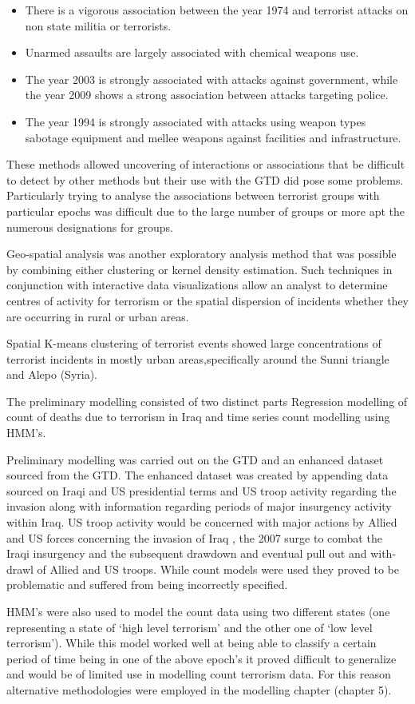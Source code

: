 \begin{itemize}
\item There is a vigorous association between the year 1974 and terrorist attacks on non state militia or terrorists.
\item Unarmed assaults are largely associated with chemical weapons use.
\item The year 2003 is strongly associated with attacks against government, while the year 2009 shows a strong association between attacks targeting police.  
\item The year 1994 is strongly associated with attacks using weapon types sabotage equipment and mellee weapons against facilities and infrastructure.
\end{itemize}

These methods allowed uncovering of interactions or associations that be difficult to detect by other methods but their use with the GTD did pose some problems. Particularly trying to analyse the associations between terrorist groups with particular epochs was difficult due to the large number of groups or more apt the numerous designations for groups. 

Geo-spatial analysis was another exploratory analysis method that was possible by combining either clustering or kernel density estimation.  Such techniques in conjunction with interactive data visualizations allow an analyst to determine centres of activity for terrorism or the spatial dispersion of incidents whether they are occurring in rural or urban areas. 

Spatial K-means clustering of terrorist events showed large concentrations of terrorist incidents in mostly urban areas,specifically around the Sunni triangle and Alepo (Syria). 

The preliminary modelling consisted of two distinct parts Regression modelling of count of deaths due to terrorism in Iraq and time series count modelling using HMM’s.

Preliminary modelling was carried out on the GTD and an enhanced dataset sourced from the GTD. The enhanced dataset was created by appending data sourced on Iraqi and US presidential terms and US troop activity regarding the invasion along with information regarding periods of major insurgency activity within Iraq. US troop activity would be concerned with major actions by Allied and US forces concerning the invasion of Iraq , the 2007 surge to combat the Iraqi insurgency and the subsequent drawdown and eventual pull out and with-drawl of Allied and US troops. While count models were used they proved to be problematic and suffered from being incorrectly specified.   

HMM’s were also used to model the count data using two different states (one representing a state of ‘high level terrorism’ and the other one of ‘low level terrorism’). While this model worked well at being able to classify a certain period of time being in one of the above epoch’s it proved difficult to generalize and would be of limited use in modelling count terrorism data. For this reason alternative methodologies were employed in the modelling chapter (chapter 5).

